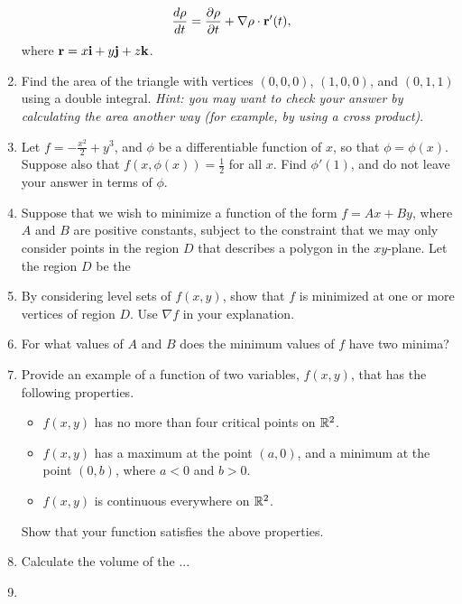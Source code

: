 \documentclass{article}
\begin{document}
\begin{enumerate}
\begin{align*}
  \frac{d\rho}{dt} &= \frac{\partial \rho}{\partial t} + \nabla \rho \cdot \mathbf{r}'(t),
\end{align*}
where $\mathbf{r} = x\mathbf{i}+y\mathbf{j}+z\mathbf{k}$.
\item %
Find the area of the triangle with vertices $(0,0,0)$, $(1,0,0)$, and $(0,1,1)$ using a double integral. \textit{Hint: you may want to check your answer by calculating the area another way (for example, by using a cross product)}.

\item %
Let $f=-\frac{x^2}{2}+y^3$, and $\phi$ be a differentiable function of $x$, so that $\phi = \phi(x)$. Suppose also that $f(x,\phi(x))=\frac{1}{2}$ for all $x$. Find $\phi'(1)$, and do not leave your answer in terms of $\phi$.
\item %
Suppose that we wish to minimize a function of the form $f=Ax+By$, where $A$ and $B$ are positive constants, subject to the constraint that we may only consider points in the region $D$ that describes a polygon in the $xy$-plane. Let the region $D$ be the 
\BEN
\item By considering level sets of $f(x,y)$, show that $f$ is minimized at one or more vertices of region $D$. Use $\nabla f$ in your explanation. 
\item For what values of $A$ and $B$ does the minimum values of $f$ have two minima? 
\EEN
\item %
Provide an example of a function of two variables, $f(x,y)$, that has the following properties. 
\begin{itemize}
  \item $f(x,y)$ has no more than four critical points on $\mathbb{R}^2$.
  \item $f(x,y)$ has a maximum at the point $(a,0)$, and a minimum at the point $(0,b)$, where $a<0$ and $b>0$.
  \item $f(x,y)$ is continuous everywhere on $\mathbb{R}^2$.
\end{itemize}
Show that your function satisfies the above properties. 

\item %
Calculate the volume of the ... 
\item %


\end{enumerate}
\end{document}
